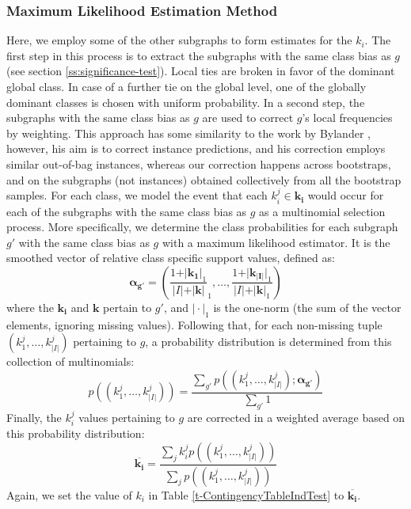 \documentclass{sig-alternate}
\begin{document}
\subsubsection{Maximum Likelihood Estimation Method}
\label{ss:MLE}
Here, we employ some of the other subgraphs to form estimates for the $k_i$.
The first step in this process is to extract the subgraphs with the same class
bias as $g$ (see section \ref{ss:significance-test}).  Local ties are broken in
favor of the dominant global class. In case of a further tie on the global
level, one of the globally dominant classes is chosen with uniform probability.
In a second step, the subgraphs with the same class bias as $g$ are used to correct
$g$'s local frequencies by weighting. This approach has some similarity to the
work by Bylander \cite{bylander02estimating}, however, his aim is to correct
instance predictions, and his correction employs similar out-of-bag instances,
whereas our correction happens across bootstraps, and on the subgraphs (not
instances) obtained collectively from all the bootstrap samples.  For each
class, we model the event that each $k_i^j \in \mathbf{k_i}$ would occur for
each of the subgraphs with the same class bias as $g$ as a multinomial
selection process.  More specifically, we determine the class probabilities for
each subgraph $g'$ with the same class bias as $g$ with a maximum likelihood
estimator. It is the smoothed vector of relative class specific support values,
defined as:
\begin{equation}
  \mathbf{\alpha_{g'}} = \left(\frac{1+\vert\mathbf{k_1}\vert_1}{\vert I\vert+\vert\mathbf{k}\vert}_1,\ldots,\frac{1+\vert\mathbf{k_{\vert I\vert}}\vert_1}{\vert I\vert+\vert\mathbf{k}\vert_1}\right)
  \label{eqn:mlexpr}
\end{equation}
where the $\mathbf{k_i}$ and $\mathbf{k}$ pertain to $g'$, and $\vert\cdot\vert_1$ is the one-norm (the sum of the vector elements, ignoring missing values). Following that, for
each non-missing tuple $(k_1^j,\ldots,k_{\vert I\vert}^j)$ pertaining to $g$, a probability distribution is
determined from this collection of multinomials:
\begin{equation}
  p((k_1^j,\ldots,k_{\vert I\vert}^j))=\frac{\sum_{g'} p((k_1^j,\ldots,k_{\vert I\vert}^j); \mathbf{\alpha_{g'}})}{\sum_{g'}1}
  \label{eqn:avgpr}
\end{equation}
Finally, the $k_i^j$ values pertaining to $g$ are corrected in a weighted average
based on this probability distribution:
\begin{equation}
  \overline{\mathbf{k_i}}=\frac{\sum_j k_i^j p((k_1^j,\ldots,k_{\vert I\vert}^j))}{\sum_j p((k_1^j,\ldots,k_{\vert I\vert}^j))}
  \label{eqn:avgki}
\end{equation}
Again, we set the value of $k_i$ in Table \ref{t-ContingencyTableIndTest} to $\overline{\mathbf{k_i}}$.
\end{document}
